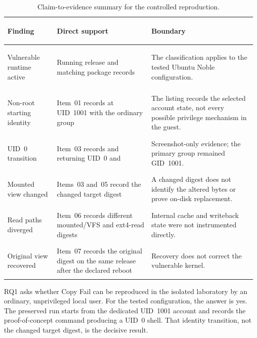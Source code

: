 \begin{table}[H]
    \centering
    \caption{Claim-to-evidence summary for the controlled reproduction.}
    \label{tab:phase02-findings}
    \small
    \begin{tabularx}{\textwidth}{@{}>{\bfseries\raggedright\arraybackslash}p{}>{\raggedright\arraybackslash}p{}Y@{}}
        \toprule
        Finding & Direct support & Boundary \\
        \midrule
        Vulnerable runtime active &
        Running release and matching  package records &
        The classification applies to the tested Ubuntu Noble configuration. \\

        Non-root starting identity &
        Item~01 records  at UID~1001 with the ordinary
         group &
        The listing records the selected account state, not every possible
        privilege mechanism in the guest. \\

        UID~0 transition &
        Item~03 records  and  returning UID~0 and
         &
        Screenshot-only evidence; the primary group remained GID~1001. \\

        Mounted view changed &
        Items~03 and~05 record the changed target digest &
        A changed digest does not identify the altered bytes or prove on-disk
        replacement. \\

        Read paths diverged &
        Item~06 records different mounted/VFS and ext4-read digests &
        Internal cache and writeback state were not instrumented directly. \\

        Original view recovered &
        Item~07 records the original digest on the same release after the
        declared reboot &
        Recovery does not correct the vulnerable kernel. \\
        \bottomrule
    \end{tabularx}
\end{table}

RQ1 asks whether Copy Fail can be reproduced in the isolated laboratory by an
ordinary, unprivileged local user. For the tested configuration, the answer is
yes. The preserved run starts from the dedicated UID~1001 account and records
the proof-of-concept command producing a UID~0 shell. That identity transition,
not the changed target digest, is the decisive result.

